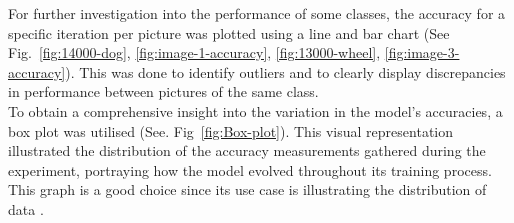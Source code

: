 For further investigation into the performance of some classes, the accuracy for a specific iteration per picture was plotted 
using a line and bar chart (See Fig.~\ref{fig:14000-dog}, \ref{fig:image-1-accuracy}, \ref{fig:13000-wheel}, \ref{fig:image-3-accuracy}). 
This was done to identify outliers and to clearly display discrepancies in performance between pictures of the same class.\\

To obtain a comprehensive insight into the variation in the model's accuracies, a box plot was utilised (See. Fig~\ref{fig:Box-plot}). This visual representation illustrated the distribution of the accuracy measurements gathered during the experiment, portraying how the model evolved throughout its training process.
This graph is a good choice since its use case is illustrating the distribution of data \parencite{Tableau}. \\

